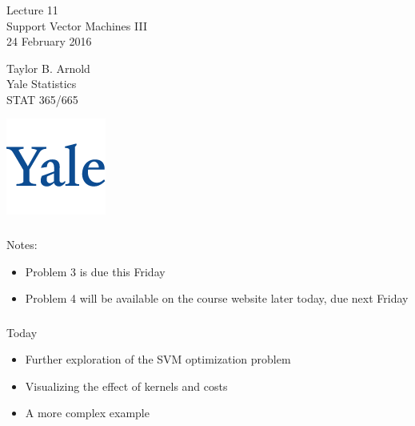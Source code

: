\documentclass[xetex,mathserif,serif,aspectratio=169]{beamer}
\begin{document}
\begin{frame}[fragile] \frametitle{} \oldB \small

\vfill

{\fontsize{0.7cm}{0cm}\selectfont Lecture 11 \\\vspace{0.2cm} Support Vector Machines III}\\\vspace{0.5cm}
24 February 2016

\vspace{2cm}

\begin{minipage}{0.6\textwidth}
Taylor B. Arnold \\
Yale Statistics \\
STAT 365/665
\end{minipage}
\hfill
\begin{minipage}{0.3\textwidth}\raggedleft
\includegraphics[scale=0.3]{../yale-logo.png}
\end{minipage}%

\end{frame}

\begin{frame}[fragile] \frametitle{} \oldB \small

Notes:
\begin{itemize}
\item Problem 3 is due this Friday
\item Problem 4 will be available on the course website later today, due next Friday
\end{itemize}

\end{frame}

\begin{frame}[fragile] \frametitle{} \oldB \small

Today
\begin{itemize}
\item Further exploration of the SVM optimization problem
\item Visualizing the effect of kernels and costs
\item A more complex example
\end{itemize}

\end{frame}
\end{document}
